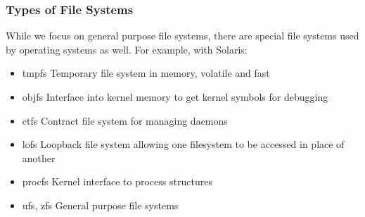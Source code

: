 \documentclass{book/custombook}
\begin{document}
                    \subsubsection{Types of File Systems}
                        While we focus on general purpose file systems, there are special file systems used by operating systems
                        as well. For example, with Solaris:
                        \begin{itemize}
                            \item tmpfs
                                \subitem Temporary file system in memory, volatile and fast
                            \item objfs
                                \subitem Interface into kernel memory to get kernel symbols for debugging
                            \item ctfs
                                \subitem Contract file system for managing daemons
                            \item lofs
                                \subitem Loopback file system allowing one filesystem to be accessed in place of another
                            \item procfs
                                \subitem Kernel interface to process structures
                            \item ufs, zfs
                                \subitem General purpose file systems
                        \end{itemize}
\end{document}
